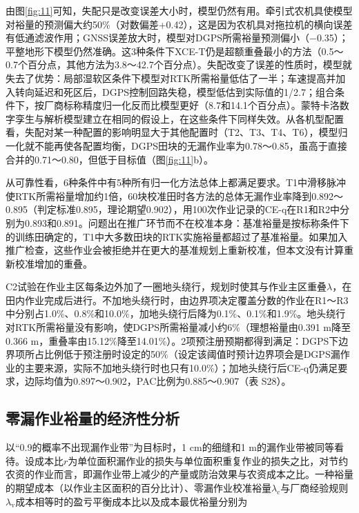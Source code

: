 \documentclass[preprint,12pt,number,sort&compress]{elsarticle}
\begin{document}
由图\ref{fig:11}可知，失配只是改变误差大小时，模型仍然有用。牵引式农机具使模型对裕量的预测偏大约50\%（对数偏差+0.42），这是因为农机具对拖拉机的横向误差有低通滤波作用；GNSS误差放大时，模型对DGPS所需裕量预测偏小（−0.35）；平整地形下模型仍然准确。这3种条件下XCE-T仍是超额重叠最小的方法（0.5～0.7个百分点，其他方法为3.8～42.7个百分点）。失配改变了误差的性质时，模型就失去了优势：局部湿软区条件下模型对RTK所需裕量低估了一半；车速提高并加入转向延迟和死区后，DGPS控制回路失稳，模型低估到实际值的1/2.7；组合条件下，按厂商标称精度归一化反而比模型更好（8.7和14.1个百分点）。蒙特卡洛数字孪生与解析模型建立在相同的假设上，在这些条件下同样失效。从各机型配置看，失配对某一种配置的影响明显大于其他配置时（T2、T3、T4、T6），模型归一化就不能再使各配置均衡，DGPS田块的无漏作业率为0.78～0.85，虽高于直接合并的0.71～0.80，但低于目标值（图\ref{fig:11}b）。

从可靠性看，6种条件中有5种所有归一化方法总体上都满足要求。T1中滑移脉冲使RTK所需裕量增加约1倍，60块校准田时各方法的总体无漏作业率降到0.892～0.895（判定标准0.895，理论期望0.902），用100次作业记录的CE-q在R1和R2中分别为0.893和0.891。问题出在推广环节而不在校准本身：基准裕量是按标称条件下的训练田确定的，T1中大多数田块的RTK实施裕量都超过了基准裕量。如果加入推广检查，这些作业会被拒绝并在更大的基准规划上重新校准，但本文没有计算重新校准增加的重叠。

C2试验在作业主区每条边外加了一圈地头绕行，规划时使其与作业主区重叠\(\lambda\)，在田内作业完成后进行。不加地头绕行时，由边界项决定覆盖分数的作业在R1～R3中分别占1.0\%、0.8\%和10.0\%，加地头绕行后降为0.1\%、0.1\%和1.9\%。地头绕行对RTK所需裕量没有影响，使DGPS所需裕量减小约6\%（理想裕量由0.391 m降至0.366 m，重叠率由15.12\%降至14.01\%）。2项预注册预期都得到满足：DGPS下边界项所占比例低于预注册时设定的50\%（设定该阈值时预计边界项会是DGPS漏作业的主要来源，实际不加地头绕行时也只有10.0\%）；加地头绕行后CE-q仍满足要求，边际均值为0.897～0.902，PAC比例为0.885～0.907（表 S28）。

\subsection{零漏作业裕量的经济性分析}

以``0.9的概率不出现漏作业带''为目标时，1 cm的细缝和1 m的漏作业带被同等看待。设成本比\(r\)为单位面积漏作业的损失与单位面积重复作业的损失之比，对节约农资的作业而言，即漏作业带上减少的产量或防治效果与农资成本之比。一种裕量的期望成本（以作业主区面积的百分比计）、零漏作业校准裕量\(\lambda_\mathrm c\)与厂商经验规则\(\lambda_\mathrm v\)成本相等时的盈亏平衡成本比以及成本最优裕量分别为
\end{document}
